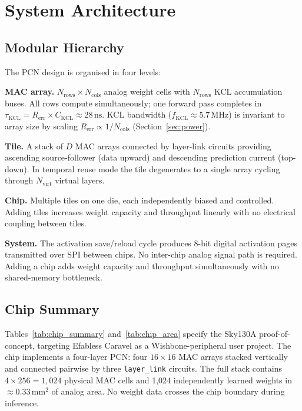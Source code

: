 \documentclass[journal,10pt,twoside]{IEEEtran}
\begin{document}
\section{System Architecture}
\label{sec:architecture}

\subsection{Modular Hierarchy}

The PCN design is organised in four levels:

\textbf{MAC array.}
$N_\text{rows} \times N_\text{cols}$ analog weight cells with $N_\text{rows}$
KCL accumulation buses.
All rows compute simultaneously; one forward pass completes in
$\tau_\text{KCL} = R_\text{err} \times C_\text{KCL} \approx 28\,\text{ns}$.
KCL bandwidth ($f_\text{KCL} \approx 5.7\,\text{MHz}$) is invariant to
array size by scaling $R_\text{err} \propto 1/N_\text{cols}$
(Section~\ref{sec:power}).

\textbf{Tile.}
A stack of $D$ MAC arrays connected by layer-link circuits providing
ascending source-follower (data upward) and descending prediction current
(top-down).
In temporal reuse mode the tile degenerates to a single array cycling
through $N_\text{virt}$ virtual layers.

\textbf{Chip.}
Multiple tiles on one die, each independently biased and controlled.
Adding tiles increases weight capacity and throughput linearly with no
electrical coupling between tiles.

\textbf{System.}
The activation save/reload cycle produces 8-bit digital activation pages
transmitted over SPI between chips.
No inter-chip analog signal path is required.
Adding a chip adds weight capacity and throughput simultaneously with no
shared-memory bottleneck.

\subsection{Chip Summary}

Tables~\ref{tab:chip_summary} and~\ref{tab:chip_area} specify the Sky130A
proof-of-concept, targeting Efabless Caravel as a Wishbone-peripheral user
project.
The chip implements a four-layer PCN: four $16{\times}16$ MAC arrays
stacked vertically and connected pairwise by three \texttt{layer\_link}
circuits.
The full stack contains $4 \times 256 = 1{,}024$ physical MAC cells and
1,024 independently learned weights in $\approx$0.33\,mm$^2$ of analog area.
No weight data crosses the chip boundary during inference.
\end{document}
